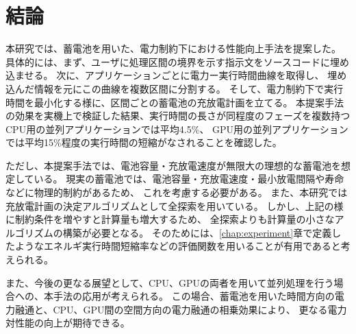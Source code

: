\chapter{結論}
\label{chap:conclusion}


本研究では、蓄電池を用いた、電力制約下における性能向上手法を提案した。
具体的には、まず、ユーザに処理区間の境界を示す指示文をソースコードに埋め込ませる。
次に、アプリケーションごとに電力ー実行時間曲線を取得し、
埋め込んだ情報を元にこの曲線を複数区間に分割する。
そして、電力制約下で実行時間を最小化する様に、区間ごとの蓄電池の充放電計画を立てる。
本提案手法の効果を実機上で検証した結果、実行時間の長さが同程度のフェーズを複数持つCPU用の並列アプリケーションでは平均4.5\%、
GPU用の並列アプリケーションでは平均15\%程度の実行時間の短縮がなされることを確認した。


ただし、本提案手法では、電池容量・充放電速度が無限大の理想的な蓄電池を想定している。
現実の蓄電池では、電池容量・充放電速度・最小放電間隔や寿命などに物理的制約があるため、
これを考慮する必要がある。
また、本研究では充放電計画の決定アルゴリズムとして全探索を用いている。
しかし、上記の様に制約条件を増やすと計算量も増大するため、
全探索よりも計算量の小さなアルゴリズムの構築が必要となる。
そのためには、\ref{chap:experiment}章で定義したようなエネルギ実行時間短縮率などの評価関数を用いることが有用であると考えられる。


また、今後の更なる展望として、CPU、GPUの両者を用いて並列処理を行う場合への、本手法の応用が考えられる。
この場合、蓄電池を用いた時間方向の電力融通と、CPU、GPU間の空間方向の電力融通の相乗効果により、
更なる電力対性能の向上が期待できる。

